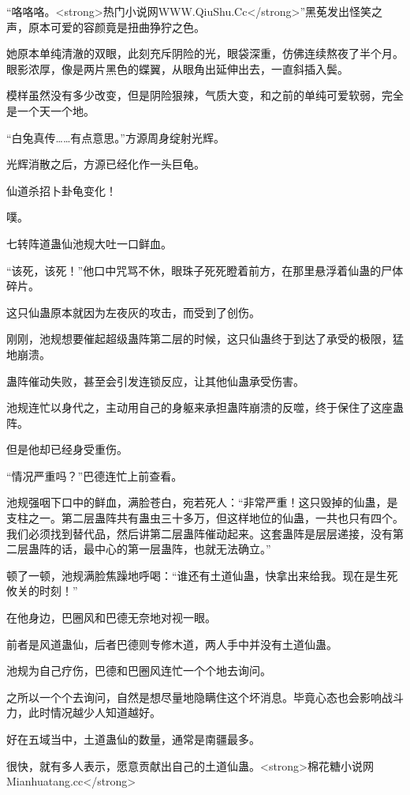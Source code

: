 
\begin{this_body}

“咯咯咯。<strong>热门小说网WWW.QiuShu.Cc</strong>”黑莬发出怪笑之声，原本可爱的容颜竟是扭曲狰狞之色。

她原本单纯清澈的双眼，此刻充斥阴险的光，眼袋深重，仿佛连续熬夜了半个月。眼影浓厚，像是两片黑色的蝶翼，从眼角出延伸出去，一直斜插入鬓。

模样虽然没有多少改变，但是阴险狠辣，气质大变，和之前的单纯可爱软弱，完全是一个天一个地。

“白兔真传……有点意思。”方源周身绽射光辉。

光辉消散之后，方源已经化作一头巨龟。

仙道杀招卜卦龟变化！

噗。

七转阵道蛊仙池规大吐一口鲜血。

“该死，该死！”他口中咒骂不休，眼珠子死死瞪着前方，在那里悬浮着仙蛊的尸体碎片。

这只仙蛊原本就因为左夜灰的攻击，而受到了创伤。

刚刚，池规想要催起超级蛊阵第二层的时候，这只仙蛊终于到达了承受的极限，猛地崩溃。

蛊阵催动失败，甚至会引发连锁反应，让其他仙蛊承受伤害。

池规连忙以身代之，主动用自己的身躯来承担蛊阵崩溃的反噬，终于保住了这座蛊阵。

但是他却已经身受重伤。

“情况严重吗？”巴德连忙上前查看。

池规强咽下口中的鲜血，满脸苍白，宛若死人：“非常严重！这只毁掉的仙蛊，是支柱之一。第二层蛊阵共有蛊虫三十多万，但这样地位的仙蛊，一共也只有四个。我们必须找到替代品，然后讲第二层蛊阵催动起来。这套蛊阵是层层递接，没有第二层蛊阵的话，最中心的第一层蛊阵，也就无法确立。”

顿了一顿，池规满脸焦躁地呼喝：“谁还有土道仙蛊，快拿出来给我。现在是生死攸关的时刻！”

在他身边，巴圈风和巴德无奈地对视一眼。

前者是风道蛊仙，后者巴德则专修木道，两人手中并没有土道仙蛊。

池规为自己疗伤，巴德和巴圈风连忙一个个地去询问。

之所以一个个去询问，自然是想尽量地隐瞒住这个坏消息。毕竟心态也会影响战斗力，此时情况越少人知道越好。

好在五域当中，土道蛊仙的数量，通常是南疆最多。

很快，就有多人表示，愿意贡献出自己的土道仙蛊。<strong>棉花糖小说网Mianhuatang.cc</strong>


\end{this_body}
